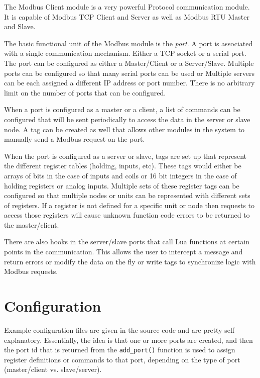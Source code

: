 The Modbus Client module is a very powerful \modbus{} Protocol communication module.
It is capable of Modbus TCP Client and Server as well as Modbus RTU Master and
Slave.

The basic functional unit of the Modbus module is the \textit{port}.  A port is
associated with a single communication mechanism.  Either a TCP socket or a serial
port.  The port can be configured as either a Master/Client or a Server/Slave.
Multiple ports can be configured so that many serial ports can be used or Multiple
servers can be each assigned a different IP address or port number.  There is no
arbitrary limit on the number of ports that can be configured.

When a port is configured as a master or a client, a list of commands can be
configured that will be sent periodically to access the data in the server or
slave node.  A tag can be created as well that allows other modules in the
system to manually send a Modbus request on the port.

When the port is configured as a server or slave, tags are set up that represent
the different register tables (holding, inputs, etc).  These tags would either be arrays
of bits in the case of inputs and coils or 16 bit integers in the case of holding
registers or analog inputs.  Multiple sets of these register tags can be configured
so that multiple nodes or units can be represented with different sets of registers.
If a register is not defined for a specific unit
or node then requests to access those registers will cause unknown function code
errors to be returned to the master/client.

There are also hooks in the server/slave ports that call Lua functions at certain
points in the communication.  This allows the user to intercept a message and
return errors or modify the data on the fly or write tags to synchronize
logic with Modbus requests.


\section{Configuration}

Example configuration files are given in the source code and are pretty self-explanatory.
Essentially, the idea is that one or more ports are created, and then the port id
that is returned from the \texttt{add\_port()} function is used to assign register
definitions or commands to that port, depending on the type of port (master/client vs. slave/server).

